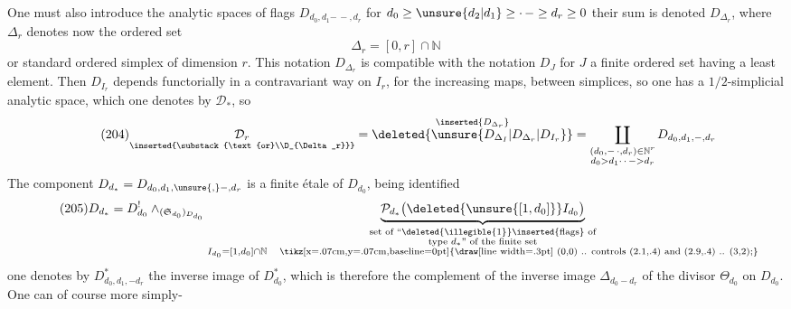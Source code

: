 One must also introduce the analytic spaces
of flags $D_{d_0,d_1\mathord{-\, -},d_r}$ for $d_0\geq \unsure{d_2|d_1}\geq\mathord{\cdot\,-}\geq d_r\geq0$
their sum is denoted $D_{\Delta_r}$, where $\Delta_r$ denotes
now the ordered set
\[
\tag{203}\Delta_r=[0,r]\cap\mathbb N
\]
or standard ordered simplex of dimension $r$. This notation
$D_{\Delta_r}$ is compatible with the notation $D_J$ for $J$
a finite ordered set having a least element.
Then $D_{I_r}$ depends functorially in a
contravariant way on $I_r$, for the increasing
maps, between simplices, so one has a
$1/2$-simplicial analytic space, which one denotes by
$\mathcal D_*$, so
\[
\tag{204}
\underset{\inserted{\substack{\text{or}\\D_{\Delta_r}}}}{\mathcal D_r}
=\overset{\inserted{D_{\Delta_r}}}{\deleted{\unsure{D_{\Delta_I}|D_{\Delta_r}|D_{I_r}}}}
=\coprod_{\substack{(d_0,\mathord{-\,\cdot},d_r)\in\mathbb N^r\\d_0>d_1\mathord{\cdot\,\cdot\,-}>d_r}}
D_{d_0,d_1,\mathord{-},d_r}
\]
The component $D_{d_*}=D_{d_0,d_1,\unsure{,}\mathord{-},d_r}$ is
a finite étale  of $D_{d_0}$, being identified
\[
\tag{205}
D_{d_*}=D^{!}_{d_0}\wedge_{(\mathfrak S_{d_0})_{D_{d_0}}}
\underbrace{\mathcal P_{d_*}\bigl(\deleted{\unsure{[1,d_0]}}I_{d_0}\bigr)}_{
\substack{\text{set of ``\deleted{\illegible{1}}\inserted{flags} of}\\
\text{type }d_*\text{'' of the finite set}\\
I_{d_0}=[1,d_0]\cap\mathbb N\quad\text{\tikz[x=.07cm,y=.07cm,baseline=0pt]{\draw[line width=.3pt] (0,0) .. controls (2.1,.4) and (2.9,.4) .. (3,2);}}}}
\]
one denotes by $D^*_{d_0,d_1,\mathord{-}d_r}$ the inverse image
of $D^*_{d_0}$, which is therefore the complement
of the inverse image $\Delta_{d_0-d_r}$ of the divisor
$\Theta_{d_0}$ on $D_{d_0}$. One can of course more simply-
